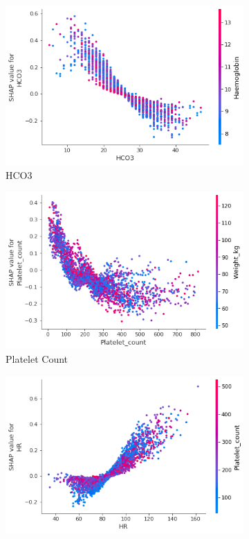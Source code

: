\documentclass[12pt]{article}
\begin{document}
\begin{figure}[H]
     \centering
     \begin{subfigure}[b]{0.47\textwidth}
         \centering
         \includegraphics[width=\linewidth]{New SHAP Global/New SHAP Global forHCO3.png}
         \caption{HCO3}
     \end{subfigure}
     \hfill
     \begin{subfigure}[b]{0.47\textwidth}
         \centering
         \includegraphics[width=\linewidth]{New SHAP Global/New SHAP Global forPlatelet_count.png}
         \caption{Platelet Count}
     \end{subfigure}
     \hfill
     \begin{subfigure}[b]{0.47\textwidth}
         \centering
         \includegraphics[width=\linewidth]{New SHAP Global/New SHAP Global forHR.png}

\end{subfigure}
\end{figure}
\end{document}
